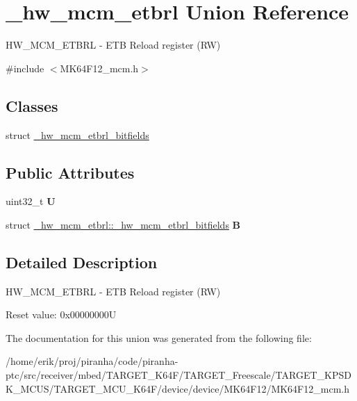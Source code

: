 \hypertarget{union__hw__mcm__etbrl}{}\section{\+\_\+hw\+\_\+mcm\+\_\+etbrl Union Reference}
\label{union__hw__mcm__etbrl}


H\+W\+\_\+\+M\+C\+M\+\_\+\+E\+T\+B\+RL -\/ E\+TB Reload register (RW)  




{\ttfamily \#include $<$M\+K64\+F12\+\_\+mcm.\+h$>$}

\subsection*{Classes}
\begin{DoxyCompactItemize}
\item 
struct \hyperlink{struct__hw__mcm__etbrl_1_1__hw__mcm__etbrl__bitfields}{\+\_\+hw\+\_\+mcm\+\_\+etbrl\+\_\+bitfields}
\end{DoxyCompactItemize}
\subsection*{Public Attributes}
\begin{DoxyCompactItemize}
\item 
uint32\+\_\+t {\bfseries U}\hypertarget{union__hw__mcm__etbrl_a7f898da0a68c1506926c00c6aa68da60}{}\label{union__hw__mcm__etbrl_a7f898da0a68c1506926c00c6aa68da60}

\item 
struct \hyperlink{struct__hw__mcm__etbrl_1_1__hw__mcm__etbrl__bitfields}{\+\_\+hw\+\_\+mcm\+\_\+etbrl\+::\+\_\+hw\+\_\+mcm\+\_\+etbrl\+\_\+bitfields} {\bfseries B}\hypertarget{union__hw__mcm__etbrl_a833de11317e51d250cec362d50460523}{}\label{union__hw__mcm__etbrl_a833de11317e51d250cec362d50460523}

\end{DoxyCompactItemize}


\subsection{Detailed Description}
H\+W\+\_\+\+M\+C\+M\+\_\+\+E\+T\+B\+RL -\/ E\+TB Reload register (RW) 

Reset value\+: 0x00000000U 

The documentation for this union was generated from the following file\+:\begin{DoxyCompactItemize}
\item 
/home/erik/proj/piranha/code/piranha-\/ptc/src/receiver/mbed/\+T\+A\+R\+G\+E\+T\+\_\+\+K64\+F/\+T\+A\+R\+G\+E\+T\+\_\+\+Freescale/\+T\+A\+R\+G\+E\+T\+\_\+\+K\+P\+S\+D\+K\+\_\+\+M\+C\+U\+S/\+T\+A\+R\+G\+E\+T\+\_\+\+M\+C\+U\+\_\+\+K64\+F/device/device/\+M\+K64\+F12/M\+K64\+F12\+\_\+mcm.\+h\end{DoxyCompactItemize}
